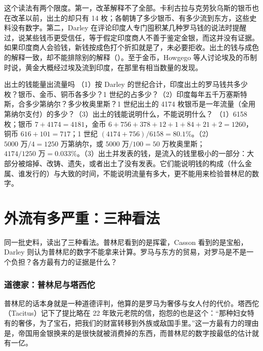 这个读法有两个限度。第一，改革解释不了全部。卡利古拉与克劳狄乌斯的银币也在改革以前，出土的却只有 14 枚；各朝铸了多少银币、有多少流到东方，这些史料没有数字。第二，Darley 在评论印度人专门囤积某几种罗马钱的说法时提醒过，说某些钱币更受信任，等于假定印度商人不善于鉴定金银，而这并没有证据\cite{darley2014}。如果印度商人会验钱，新钱按成色打个折扣就是了，未必要拒收。出土的钱与成色的解释一致，却不能排除别的解释（）。至于金币，Howgego 等人讨论埃及的币制时说，黄金大概经过埃及流到印度，在那里有相当数量的发现\cite{howgego2010}。

\begin{example}{出土的钱能量出流量吗}\label{ex:india-finds}
（1）按 Darley 的世纪合计，印度出土的罗马钱共多少枚？银币、金币、铜币各多少？1 世纪的占多少？（2）印度每年五千万塞斯特斯，合多少第纳尔？多少枚奥里斯？1 世纪出土的 4174 枚银币是一年流量（全用第纳尔支付）的多少？（3）出土的钱能说明什么，不能说明什么？
\solution （1）6158 枚；银币 $7+4174=4181$，金币 $6+756+378+12+1+84+21+2=1260$，铜币 $616+101=717$；1 世纪 $(4174+756)/6158=80.1\%$。（2）$5000\text{ 万}/4=1250$ 万第纳尔，或 $5000\text{ 万}/100=50$ 万枚奥里斯；$4174/1250\text{ 万}=0.033\%$。（3）出土并发表的钱，是流入的钱里极小的一部分：大部分被熔掉、改铸、遗失，或者出土了没有发表。它们能说明钱的构成（什么金属、谁发行的）与大致的时间，不能说明流量有多大，更不能用来检验普林尼的数字。
\end{example}


\section{外流有多严重：三种看法}\label{sec:india-debate}

同一批史料，读出了三种看法。普林尼看到的是挥霍，Casson 看到的是宝船，Darley 则认为普林尼的数字不能拿来计算。罗马与东方的贸易，对罗马是不是一个负担？各方最有力的证据是什么？

\subsubsection{道德家：普林尼与塔西佗}
普林尼的话本身就是一种道德评判，他算的是罗马为奢侈与女人付的代价。塔西佗（Tacitus）记下了提比略在 22 年致元老院的信，抱怨的也是这个：“那种妇女特有的奢侈，为了宝石，把我们的财富转移到外族或敌国手里。”\cite{tacitus_cb}这一方最有力的理由是，帝国用金银换来的是很快就被消费掉的东西，而普林尼的数字按最低的估计就有一亿。

